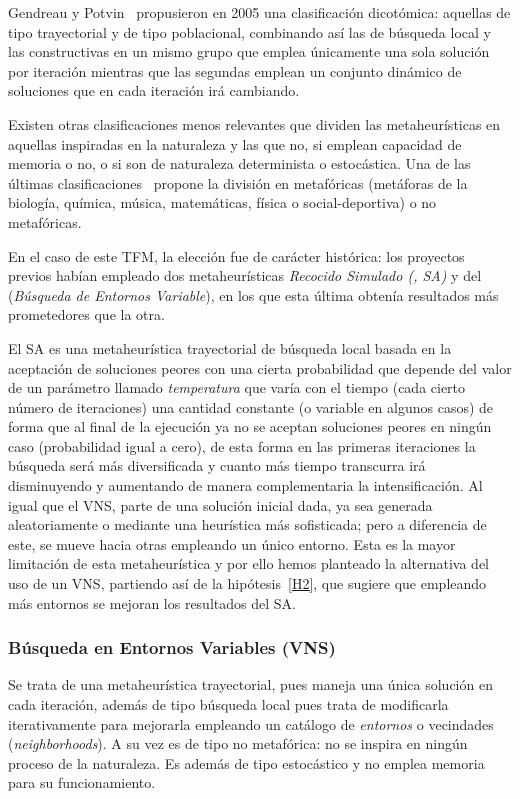Gendreau y Potvin~\cite{metaheuristicas:taxonomia2} propusieron en 2005 una clasificación dicotómica: aquellas de tipo trayectorial y de tipo poblacional, combinando así las de búsqueda local y las constructivas en un mismo grupo que emplea únicamente una sola solución por iteración mientras que las segundas emplean un conjunto dinámico de soluciones que en cada iteración irá cambiando.

Existen otras clasificaciones menos relevantes que dividen las metaheurísticas en aquellas inspiradas en la naturaleza y las que no, si emplean capacidad de memoria o no, o si son de naturaleza determinista o estocástica. Una de las últimas clasificaciones~\cite{sota:metaheuristicas} propone la división en metafóricas (metáforas de la biología, química, música, matemáticas, física o social-deportiva) o no metafóricas.

En el caso de este TFM, la elección fue de carácter histórica: los proyectos previos habían empleado dos metaheurísticas \textit{Recocido Simulado (\sa{}, SA)} y del \vns{} (\textit{Búsqueda de Entornos Variable}), en los que esta última obtenía resultados más prometedores que la otra.

El SA es una metaheurística trayectorial de búsqueda local basada en la aceptación de soluciones peores con una cierta probabilidad que depende del valor de un parámetro llamado \textit{temperatura} que varía con el tiempo (cada cierto número de iteraciones) una cantidad constante (o variable en algunos casos) de forma que al final de la ejecución ya no se aceptan soluciones peores en ningún caso (probabilidad igual a cero), de esta forma en las primeras iteraciones la búsqueda será más diversificada y cuanto más tiempo transcurra irá disminuyendo y aumentando de manera complementaria la intensificación. Al igual que el VNS, parte de una solución inicial dada, ya sea generada aleatoriamente o mediante una heurística más sofisticada; pero a diferencia de este, se mueve hacia otras empleando un único entorno. Esta es la mayor limitación de esta metaheurística y por ello hemos planteado la alternativa del uso de un VNS, partiendo así de la hipótesis~\ref{H2}, que sugiere que empleando más entornos se mejoran los resultados del SA\@.%

\subsubsection{Búsqueda en Entornos Variables (VNS)} \label{sec:vns}
Se trata de una metaheurística trayectorial, pues maneja una única solución en cada iteración, además de tipo búsqueda local pues trata de modificarla iterativamente para mejorarla empleando un catálogo de \textit{entornos} o vecindades (\textit{neighborhoods}). A su vez es de tipo no metafórica: no se inspira en ningún proceso de la naturaleza. Es además de tipo estocástico y no emplea memoria para su funcionamiento.

